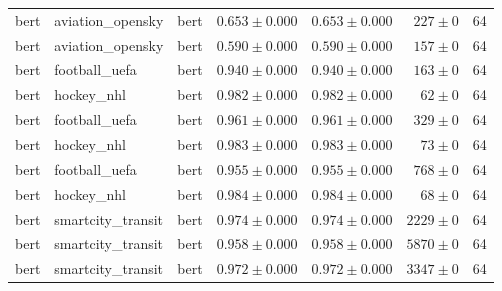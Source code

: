 \begin{table}[htbp]
\begin{tabular}{l l l r r r r}
bert & aviation\_opensky & bert & $0.653\pm0.000$ & $0.653\pm0.000$ & $227\pm0$ & 64 \\
bert & aviation\_opensky & bert & $0.590\pm0.000$ & $0.590\pm0.000$ & $157\pm0$ & 64 \\
bert & football\_uefa & bert & $0.940\pm0.000$ & $0.940\pm0.000$ & $163\pm0$ & 64 \\
bert & hockey\_nhl & bert & $0.982\pm0.000$ & $0.982\pm0.000$ & $62\pm0$ & 64 \\
bert & football\_uefa & bert & $0.961\pm0.000$ & $0.961\pm0.000$ & $329\pm0$ & 64 \\
bert & hockey\_nhl & bert & $0.983\pm0.000$ & $0.983\pm0.000$ & $73\pm0$ & 64 \\
bert & football\_uefa & bert & $0.955\pm0.000$ & $0.955\pm0.000$ & $768\pm0$ & 64 \\
bert & hockey\_nhl & bert & $0.984\pm0.000$ & $0.984\pm0.000$ & $68\pm0$ & 64 \\
bert & smartcity\_transit & bert & $0.974\pm0.000$ & $0.974\pm0.000$ & $2229\pm0$ & 64 \\
bert & smartcity\_transit & bert & $0.958\pm0.000$ & $0.958\pm0.000$ & $5870\pm0$ & 64 \\
bert & smartcity\_transit & bert & $0.972\pm0.000$ & $0.972\pm0.000$ & $3347\pm0$ & 64 \\
\hline
\end{tabular}
\end{table}
